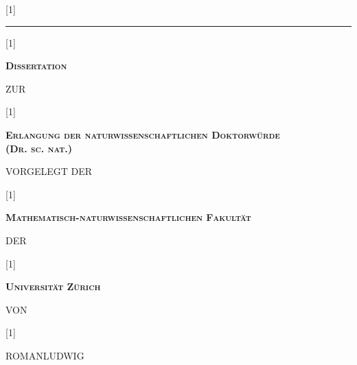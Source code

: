 \documentclass[\relativeRoot/main.tex]{subfiles}
\begin{document}
    \begin{titlepage}
        \begin{center}
            \scalebox{0.7}[1]{\begin{minipage}{1.45\textwidth}
                \centering
                \bfseries
                \scshape
                \huge
                \thetitle
            \end{minipage}} \vspace{5mm}
            
            \rule{2cm}{0.5pt} \vspace{1cm}

            \scalebox{0.8}[1]{\begin{minipage}{\textwidth}
                \centering
                \bfseries
                \scshape
                \Large
                Dissertation
            \end{minipage}} \vfill
            
            {\footnotesize ZUR} \vfill

            \scalebox{0.8}[1]{\begin{minipage}{1.2\textwidth}
                \centering
                \bfseries
                \scshape
                \Large
                Erlangung der naturwissenschaftlichen Doktorwürde\\
                \mdseries
                \large
                (Dr. sc. nat.)
            \end{minipage}}\vfill

            {\footnotesize VORGELEGT DER} \vfill

            \scalebox{0.8}[1]{\begin{minipage}{1.2\textwidth}
                \centering
                \bfseries
                \scshape
                \Large
                Mathematisch-naturwissenschaftlichen Fakultät
            \end{minipage}} \vfill

            {\footnotesize DER} \vfill

            \scalebox{0.8}[1]{\begin{minipage}{1.0\textwidth}
                \centering
                \bfseries
                \scshape
                \Large
                Universität Zürich
            \end{minipage}} \vfill

            {\footnotesize VON} \vfill

            \scalebox{1.2}[1]{\begin{minipage}{0.7\textwidth}
                \centering
                \LARGE
                \ttfamily
                ROMAN\hspace{2.5mm}LUDWIG
            \end{minipage}} \vfill


\end{center}
\end{titlepage}
\end{document}
